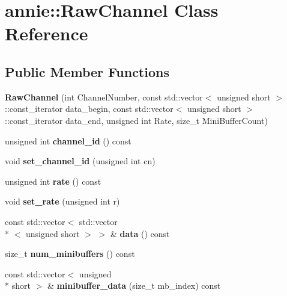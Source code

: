 \hypertarget{classannie_1_1RawChannel}{\section{annie\-:\-:Raw\-Channel Class Reference}
\label{classannie_1_1RawChannel}
}
\subsection*{Public Member Functions}
\begin{DoxyCompactItemize}
\item 
\hypertarget{classannie_1_1RawChannel_a27e98df7b68a50a45eb37897a05e5cb9}{{\bfseries Raw\-Channel} (int Channel\-Number, const std\-::vector$<$ unsigned short $>$\-::const\-\_\-iterator data\-\_\-begin, const std\-::vector$<$ unsigned short $>$\-::const\-\_\-iterator data\-\_\-end, unsigned int Rate, size\-\_\-t Mini\-Buffer\-Count)}\label{classannie_1_1RawChannel_a27e98df7b68a50a45eb37897a05e5cb9}

\item 
\hypertarget{classannie_1_1RawChannel_a3373ebec56399dedccffd7500a1037d8}{unsigned int {\bfseries channel\-\_\-id} () const }\label{classannie_1_1RawChannel_a3373ebec56399dedccffd7500a1037d8}

\item 
\hypertarget{classannie_1_1RawChannel_aeda7fd3faeaeff8677774891028df7ca}{void {\bfseries set\-\_\-channel\-\_\-id} (unsigned int cn)}\label{classannie_1_1RawChannel_aeda7fd3faeaeff8677774891028df7ca}

\item 
\hypertarget{classannie_1_1RawChannel_a8fd58d4ca2ffbf5640182d245b90427f}{unsigned int {\bfseries rate} () const }\label{classannie_1_1RawChannel_a8fd58d4ca2ffbf5640182d245b90427f}

\item 
\hypertarget{classannie_1_1RawChannel_adf62dc9e7c6a19fa7cb9e52b6a444e46}{void {\bfseries set\-\_\-rate} (unsigned int r)}\label{classannie_1_1RawChannel_adf62dc9e7c6a19fa7cb9e52b6a444e46}

\item 
\hypertarget{classannie_1_1RawChannel_a8810255f132ada05b9c2a22cedbceb3c}{const std\-::vector$<$ std\-::vector\\*
$<$ unsigned short $>$ $>$ \& {\bfseries data} () const }\label{classannie_1_1RawChannel_a8810255f132ada05b9c2a22cedbceb3c}

\item 
\hypertarget{classannie_1_1RawChannel_a3f5a72a2bb549ac062bc7f11bf575e8f}{size\-\_\-t {\bfseries num\-\_\-minibuffers} () const }\label{classannie_1_1RawChannel_a3f5a72a2bb549ac062bc7f11bf575e8f}

\item 
\hypertarget{classannie_1_1RawChannel_a0900f9b35249c2d47ab144c695e47e63}{const std\-::vector$<$ unsigned \\*
short $>$ \& {\bfseries minibuffer\-\_\-data} (size\-\_\-t mb\-\_\-index) const }\label{classannie_1_1RawChannel_a0900f9b35249c2d47ab144c695e47e63}

\end{DoxyCompactItemize}
